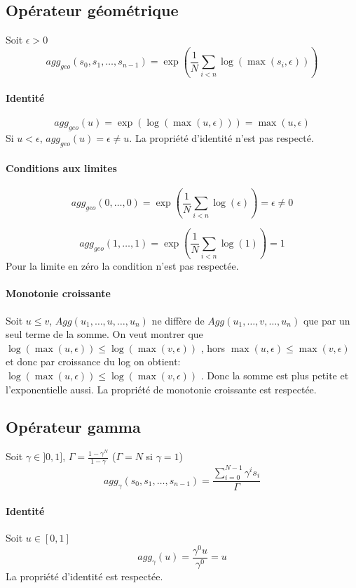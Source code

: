 \documentclass[11pt]{extarticle}
\begin{document}
\subsection{Opérateur géométrique}
Soit $\epsilon>0$
    \begin{equation}
            agg_{geo}(s_0,s_1,\dots,s_{n-1}) =\exp\left( \frac{1}{N} \sum_{i<n} \log(\max(s_i,\epsilon ))\right) 
    \end{equation}

\paragraph{Identité}
$$agg_{geo}(u) = \exp(\log(\max(u,\epsilon))) = \max(u,\epsilon)$$
Si $u<\epsilon$, $agg_{geo}(u)=\epsilon \neq u$. La propriété d'identité n'est pas respecté.

\paragraph{Conditions aux limites}
$$agg_{geo}(0,\dots,0) =\exp\left( \frac{1}{N} \sum_{i<n} \log(\epsilon)\right) =  \epsilon\neq 0$$

$$agg_{geo}(1,\dots,1) =\exp\left( \frac{1}{N} \sum_{i<n} \log(1)\right) =  1$$
Pour la limite en zéro la condition n'est pas respectée.

\paragraph{Monotonie croissante}
Soit $u \leq v$, $Agg(u_1,\dots,u,\dots,u_n)$ ne diffère de $ Agg(u_1,\dots,v,\dots,u_n)$ que par un seul terme de la somme.
On veut montrer que $\log(\max(u,\epsilon))\leq \log(\max(v,\epsilon))$ , hors $\max(u,\epsilon) \leq \max(v,\epsilon)$ et donc par croissance du log on obtient: $\log(\max(u,\epsilon))\leq \log(\max(v,\epsilon))$ . Donc la somme est plus petite et l'exponentielle aussi. La propriété de monotonie croissante est respectée.

\subsection{Opérateur gamma}
Soit $\gamma\in ]0,1]$, $\Gamma = \frac{1-\gamma^{N}}{1-\gamma}$ ($\Gamma =N $ si $\gamma=1$)
    \begin{equation}
        agg_{\gamma}(s_0,s_1,\dots,s_{n-1}) = \frac{ \sum_{i=0}^{N-1}\gamma^is_i}{\Gamma}
    \end{equation}
\paragraph{Identité}
Soit $u\in [0,1]$
$$agg_\gamma(u)= \frac{\gamma^0u}{\gamma^0}= u$$
La propriété d'identité est respectée.
\end{document}
